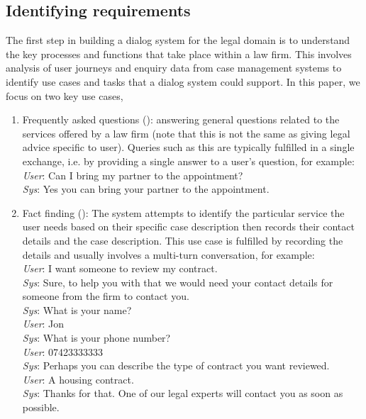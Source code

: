 \documentclass[runningheads]{llncs}
\begin{document}
\subsection{Identifying requirements}\label{sec:Identifying requirements}
The first step in building a dialog system for the legal domain is to understand the key processes and functions that take place within a law firm. This involves analysis of user journeys and enquiry data from case management systems to identify use cases and tasks that a dialog system could support. In this paper, we focus on two key use cases,
\begin{enumerate}
    \item Frequently asked questions (\faq): answering general questions related to the services offered by a law firm (note that this is not the same as giving legal advice specific to user). Queries such as this are typically fulfilled in a single exchange, i.e. by providing a single answer to a user's question, for example:\\
    \textit{User}: Can I bring my partner to the appointment?\\
    \textit{Sys}: Yes you can bring your partner to the appointment.\\
    
    \item Fact finding (\ff): The system attempts to identify the particular service the user needs based on their specific case description then records their contact details and the case description. 
    This use case is fulfilled by recording the details and usually involves a multi-turn conversation, for example:\\
    \textit{User}: I want someone to review my contract.\\
    \textit{Sys}: Sure, to help you with that we would need your contact details for someone from the firm to contact you.\\
    \textit{Sys}: What is your name?\\
    \textit{User}: Jon \\
    \textit{Sys}: What is your phone number?\\
    \textit{User}: 07423333333\\
    \textit{Sys}: Perhaps you can describe the type of contract you want reviewed.\\
    \textit{User}: A housing contract.\\
    \textit{Sys}: Thanks for that. One of our legal experts will contact you as soon as possible.
\end{enumerate}
\end{document}
